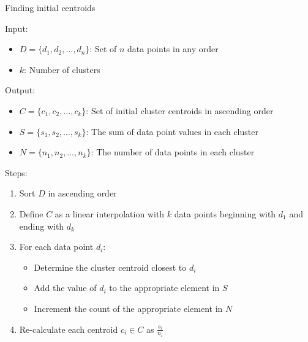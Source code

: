\documentclass[conference,compsoc]{IEEEtran}
\begin{document}
\begin{algorithm}\label{alg-2}
    \caption{Finding initial centroids}
    Input:
        \begin{itemize}
            \item $D = \{d_1, d_2, \dots, d_n\}$: Set of $n$ data points in any order
            \item $k$: Number of clusters
        \end{itemize}
    Output:
        \begin{itemize}
            \item $C = \{c_1, c_2, \dots, c_k\}$: Set of initial cluster centroids in ascending order
            \item $S = \{s_1, s_2, \dots, s_k\}$: The sum of data point values in each cluster
            \item $N = \{n_1, n_2, \dots, n_k\}$: The number of data points in each cluster
        \end{itemize}
    Steps:
        \begin{enumerate}
            \item Sort $D$ in ascending order
            \item Define $C$ as a linear interpolation with $k$ data points beginning with $d_1$ and ending with $d_k$
            \item For each data point $d_i$:
            \begin{itemize}
                \item Determine the cluster centroid closest to $d_i$
                \item Add the value of $d_i$ to the appropriate element in $S$
                \item Increment the count of the appropriate element in $N$
            \end{itemize}
            \item Re-calculate each centroid $c_i \in C$ as $\frac{s_i}{n_i}$
        \end{enumerate}
\end{algorithm}
\end{document}
